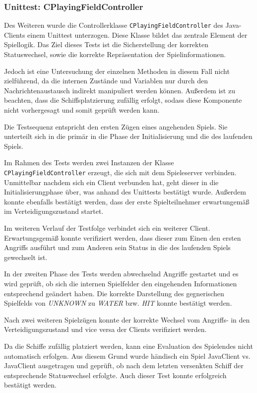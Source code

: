 \subsubsection{Unittest: CPlayingFieldController}
Des Weiteren wurde die Controllerklasse \texttt{CPlayingFieldController} des Java-Clients einem Unittest unterzogen.
Diese Klasse bildet das zentrale Element der Spiellogik.
Das Ziel dieses Tests ist die Sicherstellung der korrekten Statuswechsel, sowie die korrekte Repräsentation der Spielinformationen.

Jedoch ist eine Untersuchung der einzelnen Methoden in diesem Fall nicht zielführend, da die internen Zustände und Variablen nur durch den Nachrichtenaustausch indirekt manipuliert werden können.
Außerdem ist zu beachten, dass die Schiffsplatzierung zufällig erfolgt, sodass diese Komponente nicht vorhergesagt und somit geprüft werden kann.

Die Testsequenz entspricht den ersten Zügen eines angehenden Spiels. 
Sie unterteilt sich in die primär in die Phase der Initialisierung und die des laufenden Spiels.

Im Rahmen des Tests werden zwei Instanzen der Klasse \texttt{CPlayingFieldController} erzeugt, die sich mit dem Spieleserver verbinden.
Unmittelbar nachdem sich ein Client verbunden hat, geht dieser in die Initialisierungphase über, was anhand des Unittests bestätigt wurde.
Außerdem konnte ebenfalls bestätigt werden, dass der erste Spielteilnehmer erwartungemäß im Verteidigungszustand startet.

Im weiteren Verlauf der Testfolge verbindet sich ein weiterer Client.
Erwartungsgemäß konnte verifiziert werden, dass dieser zum Einen den ersten Angriffs ausführt und zum Anderen sein Status in die des laufenden Spiels gewechselt ist.

In der zweiten Phase des Tests werden abwechselnd Angriffe gestartet und es wird geprüft, ob sich die internen Spielfelder den eingehenden Informationen entsprechend geändert haben.
Die korrekte Darstellung des gegnerischen Spielfelds von \emph{UNKNOWN} zu \emph{WATER} bzw. \emph{HIT} konnte bestätigt werden.

Nach zwei weiteren Spielzügen konnte der korrekte Wechsel vom Angriffs- in den Verteidigungszustand und vice versa der Clients verifiziert werden.

Da die Schiffe zufällig platziert werden, kann eine Evaluation des Spielendes nicht automatisch erfolgen.
Aus diesem Grund wurde händisch ein Spiel JavaClient vs. JavaClient ausgetragen und geprüft, ob nach dem letzten versenkten Schiff der entsprechende Statuswechsel erfolgte.
Auch dieser Test konnte erfolgreich bestätigt werden.